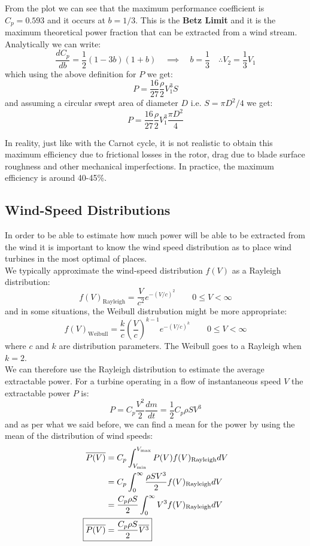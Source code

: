 \noindent From the plot we can see that the maximum performance coefficient is
$C_p = 0.593$ and it occurs at $b=1/3$. This is the \textbf{Betz Limit} and it
is the maximum theoretical power fraction that can be extracted from a wind stream.
Analytically we can write:
$$
\frac{dC_p}{db} = \frac{1}{2} (1 - 3b)(1+b) \quad \implies \quad b = \frac{1}{3}
\quad \therefore V_2 = \frac{1}{3}V_1
$$
which using the above definition for $P$ we get:
$$
P = \frac{16}{27} \frac{\rho}{2} V_1^3 S
$$
and assuming a circular swept area of diameter $D$ i.e. $S = \pi D^2/4$ we get:
$$
P = \frac{16}{27} \frac{\rho}{2} V_1^3 \frac{\pi D^2}{4}
$$

\noindent In reality, just like with the Carnot cycle, it is not realistic to obtain this
maximum efficiency due to frictional losses in the rotor, drag due to blade surface
roughness and other mechanical imperfections. In practice, the maximum efficiency
is around 40-45\%.

\subsection{Wind-Speed Distributions}
\label{sec:windspeed_distributions}

In order to be able to estimate how much power will be able to be extracted from
the wind it is important to know the wind speed distribution as to place wind 
turbines in the most optimal of places.\\

We typically approximate the wind-speed distribution $f(V)$ as a Rayleigh distribution:
$$
f(V)_{\text{Rayleigh}} = \frac{V}{c^2} e^{-(V/c)^2} \quad \quad 0 \leq V < \infty
$$
and in some situations, the Weibull distrubution might be more appropriate:
$$
f(V)_{\text{Weibull}} = \frac{k}{c} \left(\frac{V}{c}\right)^{k-1} e^{-(V/c)^k}
\quad \quad 0 \leq V < \infty
$$
where $c$ and $k$ are distribution parameters. The Weibull goes to a Rayleigh
when $k=2$.\\

We can therefore use the Rayleigh distribution to estimate the average extractable
power. For a turbine operating in a flow of instantaneous speed $V$ the extractable 
power $P$ is:
$$
P = C_p \frac{V^2}{2} \frac{dm}{dt} = \frac{1}{2} C_p \rho S V^3
$$
and as per what we said before, we can find a mean for the power by using the mean
of the distribution of wind speeds:
\begin{align*}
    \overline{P(V)} &= C_p \int_{V_{\text{min}}}^{V_{\text{max}}} P(V) f(V)_{\text{Rayleigh}} dV\\
    &= C_p \int_0^\infty \frac{\rho S V^3}{2} f(V)_{\text{Rayleigh}} dV\\
    &= \frac{C_p \rho S}{2} \int_0^\infty V^3 f(V)_{\text{Rayleigh}} dV\\
    \Aboxed{\overline{P(V)} &= \frac{C_p \rho S}{2} \overline{V^3}}
\end{align*}

